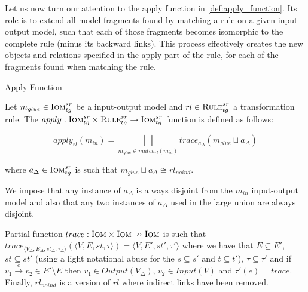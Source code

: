Let us now turn our attention to the apply function in \cref{def:apply_function}. Its role is to extend all model fragments found by matching a rule on a given input-output model, such that each of those fragments becomes isomorphic to the complete rule (minus its backward links). This process effectively creates the new objects and relations specified in the apply part of the rule, for each of the fragments found when matching the rule.

\begin{definition}{Apply Function}
\label{def:apply_function}

  
Let $m_{glue}\in \textsc{Iom}^{sr}_{tg}$ be a input-output model and $rl\in \textsc{Rule}^{sr}_{tg}$ a
transformation rule. The $apply : \textsc{Iom}^{sr}_{tg}\times \textsc{Rule}^{sr}_{tg}\rightarrow \textsc{Iom}^{sr}_{tg}$ function
is defined as follows: 

$$apply_{rl}(m_{in})=\bigsqcup_{m_{glue}\in match_{rl}(m_{in})}trace_{a_{\Delta}}(m_{glue}\sqcup a_{\Delta})$$

\begin{center}
where $a_{\Delta}\in \textsc{Iom}^{sr}_{tg}$ is such that $m_{glue} \sqcup a_{\Delta}\cong rl_{noind}$.\\
\end{center}

We impose that any instance of $a_\Delta$ is always disjoint from the $m_{in}$ input-output model and also that any two instances of $a_\Delta$ used in the large union are always disjoint.

Partial function $trace:\textsc{Iom}\times \textsc{Iom} \nrightarrow \textsc{Iom}$ is such that $trace_{\langle V_{\Delta},E_{\Delta},st_{\Delta},\tau_{\Delta}\rangle}(\langle V,E,st,\tau\rangle) = \langle V,E',st',\tau'\rangle$ where we have that $E\subseteq E'$, $st\subseteq st'$ (using a light notational abuse for the $s\subseteq s'$ and $t\subseteq t'$), $\tau \subseteq \tau'$ and if $v_1\xrightarrow{e} v_2\in E'\setminus E$ then $v_1\in Output(V_{\Delta})$, $v_2\in Input(V)$ and $\tau'(e)=trace$. Finally, $rl_{noind}$ is a version of $rl$ where indirect links have been removed.
\end{definition}
% 


